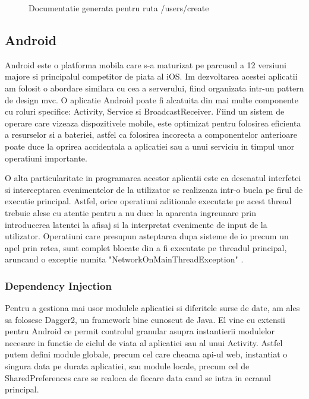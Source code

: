 \begin{figure}[H]
  \centering
  \caption{Documentatie generata pentru ruta /users/create}
\end{figure}

\subsection {Android}

Android este o platforma mobila care s-a maturizat pe parcusul a 12 versiuni majore si principalul competitor de piata al iOS. Im dezvoltarea acestei aplicatii am folosit o abordare similara cu cea a serverului, fiind organizata intr-un pattern de design \acrshort{mvc}. O aplicatie Android poate fi alcatuita din mai multe componente cu roluri specifice: Activity, Service si BroadcastReceiver. Fiind un sistem de operare care vizeaza dispozitivele mobile, este optimizat pentru folosirea eficienta a resurselor si a bateriei, astfel ca folosirea incorecta a componentelor anterioare poate duce la oprirea accidentala a aplicatiei sau a unui serviciu in timpul unor operatiuni importante.

O alta particularitate in programarea acestor aplicatii este ca desenatul interfetei si interceptarea evenimentelor de la utilizator se realizeaza intr-o bucla pe firul de executie principal. Astfel, orice operatiuni aditionale executate pe acest thread trebuie alese cu atentie pentru a nu duce la aparenta ingreunare prin introducerea latentei la afisaj si la interpretat evenimente de input de la utilizator. Operatiuni care presupun asteptarea dupa sisteme de \acrshort{io} precum un apel prin retea, sunt complet blocate din a fi executate pe threadul principal, aruncand o exceptie numita "NetworkOnMainThreadException" \cite{AndroidNetwork2022}.

\subsubsection {Dependency Injection}

Pentru a gestiona mai usor modulele aplicatiei si diferitele surse de date, am ales sa folosesc Dagger2, un framework bine cunoscut de Java. El vine cu extensii pentru Android ce permit controlul granular asupra instantierii modulelor necesare in functie de ciclul de viata al aplicatiei sau al unui Activity. Astfel putem defini module globale, precum cel care cheama api-ul web, instantiat o singura data pe durata aplicatiei, sau module locale, precum cel de SharedPreferences care se realoca de fiecare data cand se intra in ecranul principal.

